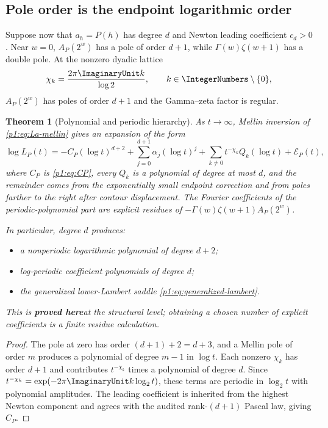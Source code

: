 \documentclass[11pt,oneside]{article}
\numberwithin{equation}{section}
\newtheorem{theorem}{Theorem}[section]
\theoremstyle{definition}
\theoremstyle{remark}
\newcommand{\statusproved}{\textcolor{deepgreen}{\textbf{proved here}}}
\begin{document}
\subsection{Pole order is the endpoint logarithmic order}

Suppose now that $a_h=P(h)$ has degree $d$ and Newton leading coefficient $c_d>0$.  Near
$w=0$, $A_P(2^w)$ has a pole of order $d+1$, while
$\Gamma(w)\zeta(w+1)$ has a double pole.  At the nonzero dyadic lattice
\begin{equation}
 \chi_k=\frac{2\pi\ImaginaryUnit k}{\log2},
 \qquad k\in\IntegerNumbers\setminus\{0\},
 \label{p1:eq:dyadic-lattice}
\end{equation}
$A_P(2^w)$ has poles of order $d+1$ and the Gamma--zeta factor is regular.

\begin{theorem}[Polynomial and periodic hierarchy]
\label{p1:thm:pole-hierarchy}
As $t\to\infty$, Mellin inversion of \eqref{p1:eq:La-mellin} gives an expansion of the form
\begin{equation}
 \log L_P(t)
 =-C_P(\log t)^{d+2}
  +\sum_{j=0}^{d+1}\alpha_j(\log t)^j
  +\sum_{k\ne0}t^{-\chi_k}Q_k(\log t)
  +\mathcal E_P(t),
 \label{p1:eq:logLP-structure}
\end{equation}
where $C_P$ is \eqref{p1:eq:CP}, every $Q_k$ is a polynomial of degree at most $d$, and the
remainder comes from the exponentially small endpoint correction and from poles farther to
the right after contour displacement.  The Fourier coefficients of the periodic-polynomial
part are explicit residues of
$-\Gamma(w)\zeta(w+1)A_P(2^w)$.

In particular, degree $d$ produces:
\begin{itemize}
\item a nonperiodic logarithmic polynomial of degree $d+2$;
\item log-periodic coefficient polynomials of degree $d$;
\item the generalized lower-Lambert saddle \eqref{p1:eq:generalized-lambert}.
\end{itemize}
This is \statusproved at the structural level; obtaining a chosen number of explicit
coefficients is a finite residue calculation.
\end{theorem}

\begin{proof}
The pole at zero has order $(d+1)+2=d+3$, and a Mellin pole of order $m$ produces a
polynomial of degree $m-1$ in $\log t$.  Each nonzero $\chi_k$ has order $d+1$ and contributes
$t^{-\chi_k}$ times a polynomial of degree $d$.  Since
$t^{-\chi_k}=\exp(-2\pi\ImaginaryUnit k\log_2t)$, these terms are periodic in $\log_2t$ with polynomial
amplitudes.  The leading coefficient is inherited from the highest Newton component and
agrees with the audited rank-$(d+1)$ Pascal law, giving $C_P$.
\end{proof}
\end{document}

